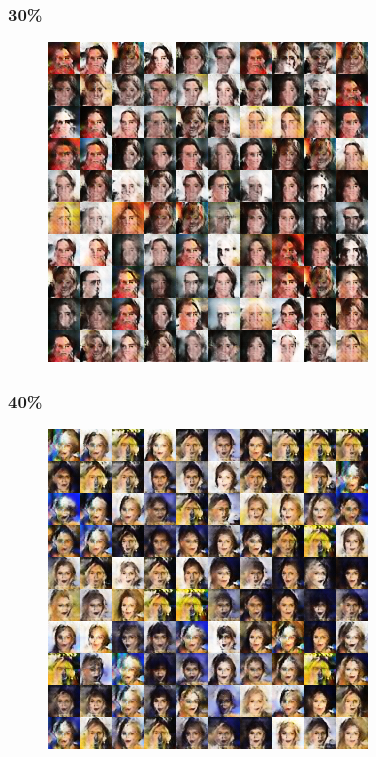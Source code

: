 \documentclass[dvipdfmx,12pt]{beamer}
\begin{document}
\begin{frame}
	\frametitle{30\%}
	\begin{figure}[htbp]
	\begin{center}
	\includegraphics[width=0.7\hsize]{./dcgan/image00030000.png}
	\end{center}
	\end{figure}
\end{frame}
\begin{frame}
	\frametitle{40\%}
	\begin{figure}[htbp]
	\begin{center}
	\includegraphics[width=0.7\hsize]{./dcgan/image00040000.png}
	\end{center}
	\end{figure}
\end{frame}
\end{document}
